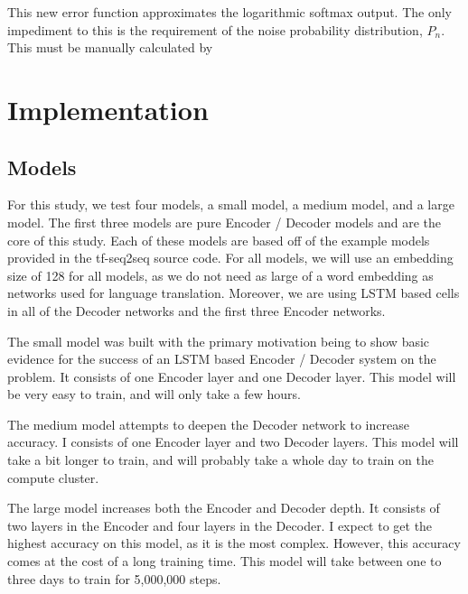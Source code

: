 \documentclass[pageno]{jpaper}
\begin{document}
This new error function approximates the logarithmic softmax output.  The only impediment to this is the requirement of the noise probability distribution, $P_{n}$.  This must be manually calculated by 

\section{Implementation}

\subsection{Models}
For this study, we test four models, a small model, a medium model, and a large model.  The first three models are pure Encoder / Decoder models and are the core of this study.  Each of these models are based off of the example models provided in the tf-seq2seq source code. For all models, we will use an embedding size of 128 for all models, as we do not need as large of a word embedding as networks used for language translation.  Moreover, we are using LSTM based cells in all of the Decoder networks and the first three Encoder networks.

\par
The small model was built with the primary motivation being to show basic evidence for the success of an LSTM based Encoder / Decoder system on the problem.  It consists of one Encoder layer and one Decoder layer.  This model will be very easy to train, and will only take a few hours.

\par
The medium model attempts to deepen the Decoder network to increase accuracy.  I consists of one Encoder layer and two Decoder layers.  This model will take a bit longer to train, and will probably take a whole day to train on the compute cluster. 

\par
The large model increases both the Encoder and Decoder depth.  It consists of two layers in the Encoder and four layers in the Decoder.  I expect to get the highest accuracy on this model, as it is the most complex.  However, this accuracy comes at the cost of a long training time. This model will take between one to three days to train for 5,000,000 steps.
\end{document}
